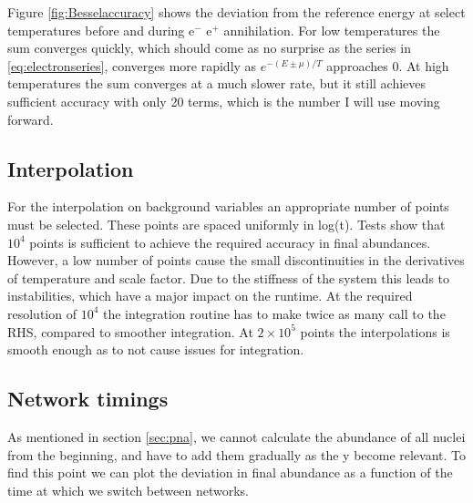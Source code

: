 Figure \ref{fig:Besselaccuracy} shows the deviation from the reference energy at select temperatures before and during e$^-$ e$^+$ annihilation. For low temperatures the sum converges quickly, which should come as no surprise as the series in \eqref{eq:electronseries}, converges more rapidly as $e^{-(E\pm\mu)/T}$ approaches 0. At high temperatures the sum converges at a much slower rate, but it still achieves sufficient accuracy with only 20 terms, which is the number I will use moving forward.

\subsection{Interpolation}
\label{sec:interpolation}
For the interpolation on background variables an appropriate number of points must be selected. These points are spaced uniformly in log(t). Tests show that $10^4$ points is sufficient to achieve the required accuracy in final abundances. However, a low number of points cause the small discontinuities in the derivatives of temperature and scale factor. Due to the stiffness of the system this leads to instabilities, which have a major impact on the runtime. At the required resolution of $10^4$ the integration routine has to make twice as many call to the RHS, compared to smoother integration. At $2\times 10^5$ points the interpolations is smooth enough as to not cause issues for integration.


\subsection{Network timings}
\label{sec:networktiming}
As  mentioned in section \ref{sec:pna}, we cannot calculate the abundance of all nuclei from the beginning, and have to add them gradually as the y become relevant. To find this point we can plot the deviation in final abundance as a function of the time at which we switch between networks.
